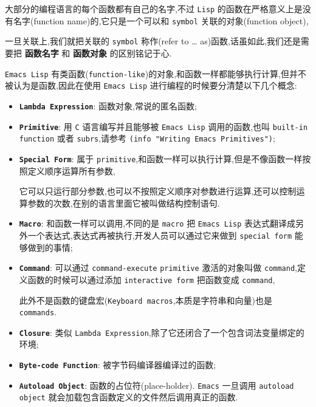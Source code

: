 \documentclass[11pt]{article}
\begin{document}
大部分的编程语言的每个函数都有自己的名字,不过 \texttt{Lisp} 的函数在严格意义上是没有名字(function name)的,它只是一个可以和 \texttt{symbol} 关联的对象(function object),

一旦关联上,我们就把关联的 \texttt{symbol} 称作(refer to \ldots{} as)函数,话虽如此,我们还是需要把 \textbf{函数名字} 和 \textbf{函数对象} 的区别铭记于心.


\texttt{Emacs Lisp} 有类函数(\texttt{function-like})的对象,和函数一样都能够执行计算,但并不被认为是函数,因此在使用 \texttt{Emacs Lisp} 进行编程的时候要分清楚以下几个概念:

\begin{itemize}
\item \textbf{\texttt{Lambda Expression}}: 函数对象,常说的匿名函数;

\item \textbf{\texttt{Primitive}}: 用 \texttt{C} 语言编写并且能够被 \texttt{Emacs Lisp} 调用的函数,也叫 \texttt{built-in function} 或者 \texttt{subrs},请参考 \texttt{(info "Writing Emacs Primitives")};

\item \textbf{\texttt{Special Form}}: 属于 \texttt{primitive},和函数一样可以执行计算,但是不像函数一样按照定义顺序运算所有参数,

它可以只运行部分参数,也可以不按照定义顺序对参数进行运算,还可以控制运算参数的次数,在别的语言里面它被叫做结构控制语句.

\item \textbf{\texttt{Macro}}: 和函数一样可以调用,不同的是 \texttt{macro} 把 \texttt{Emacs Lisp} 表达式翻译成另外一个表达式,表达式再被执行,开发人员可以通过它来做到 \texttt{special form} 能够做到的事情;

\item \textbf{\texttt{Command}}: 可以通过 \texttt{command-execute} \texttt{primitive} 激活的对象叫做 \texttt{command},定义函数的时候可以通过添加 \texttt{interactive form} 把函数变成 \texttt{command},

此外不是函数的键盘宏(\texttt{Keyboard macros},本质是字符串和向量)也是 \texttt{commands}.

\item \textbf{\texttt{Closure}}: 类似 \texttt{Lambda Expression},除了它还闭合了一个包含词法变量绑定的环境;

\item \textbf{\texttt{Byte-code Function}}: 被字节码编译器编译过的函数;

\item \textbf{\texttt{Autoload Object}}: 函数的占位符(place-holder). \texttt{Emacs} 一旦调用 \texttt{autoload object} 就会加载包含函数定义的文件然后调用真正的函数.
\end{itemize}
\end{document}
